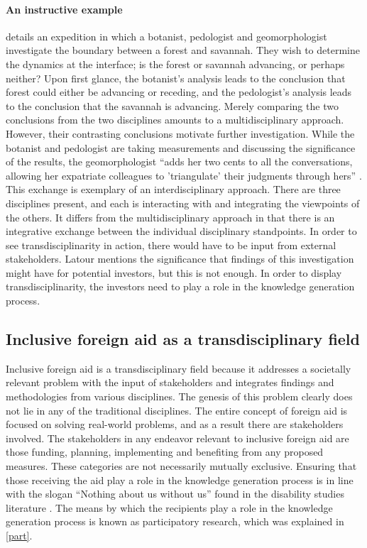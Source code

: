 \documentclass[a4paper]{article}
\begin{document}
\paragraph{An instructive example}

\cite{latour1999circulating} details an expedition in which a botanist,
pedologist and geomorphologist investigate the boundary between a forest and
savannah. They wish to determine the dynamics at the interface; is the forest
or savannah advancing, or perhaps neither? Upon first glance, the botanist's
analysis leads to the conclusion that forest could either be advancing or
receding, and the pedologist's analysis leads to the conclusion that the
savannah is advancing. Merely comparing the two conclusions from the two
disciplines amounts to a multidisciplinary approach. However, their
contrasting conclusions motivate further investigation. While the botanist and
pedologist are taking measurements and discussing the significance of the
results, the geomorphologist ``adds her two cents to all the conversations,
allowing her expatriate colleagues to 'triangulate' their judgments through
hers'' \citep{latour1999circulating}. This exchange is exemplary of an
interdisciplinary approach. There are three disciplines present, and each is
interacting with and integrating the viewpoints of the others. It differs from
the multidisciplinary approach in that there is an integrative exchange
between the individual disciplinary standpoints. In order to see
transdisciplinarity in action, there would have to be input from external
stakeholders. Latour mentions the significance that findings of this
investigation might have for potential investors, but this is not enough. In
order to display transdisciplinarity, the investors need to play a role in the
knowledge generation process.

\subsection{Inclusive foreign aid as a transdisciplinary field}

Inclusive foreign aid is a transdisciplinary field because it addresses a
societally relevant problem with the input of stakeholders and integrates
findings and methodologies from various disciplines. The genesis of this
problem clearly does not lie in any of the traditional disciplines. The entire
concept of foreign aid is focused on solving real-world problems, and as a
result there are stakeholders involved. The stakeholders in any endeavor
relevant to inclusive foreign aid are those funding, planning, implementing
and benefiting from any proposed measures. These categories are not
necessarily mutually exclusive. Ensuring that those receiving the aid play a
role in the knowledge generation process is in line with the slogan ``Nothing
about us without us'' found in the disability studies literature
\citep{pfeiffer2000disability}. The means by which the recipients play a role
in the knowledge generation process is known as participatory research, which
was explained in \autoref{part}.
\end{document}
